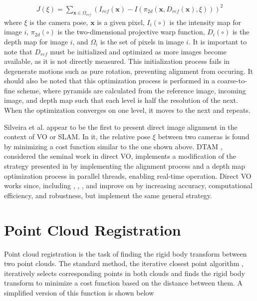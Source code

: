 \documentclass[conference]{IEEEtran}
\begin{document}
\begin{align}\label{cost_function}
    J(\xi) = \sum_{\textbf{x} \in \Omega_{ref}} (I_{ref}(\textbf{x}) - I(\pi_{2d}(\textbf{x}, D_{ref}(\textbf{x}), \xi)))^2
\end{align}
where $\xi$ is the camera pose, $\textbf{x}$ is a given pixel, $I_i(\circ)$ is the intensity map for image $i$, $\pi_{2d}(\circ)$ is the two-dimensional projective warp function, $D_i(\circ)$ is the depth map for image $i$, and $\Omega_i$ is the set of pixels in image $i$.
It is important to note that $D_{ref}$ must be initialized and optimized as more images become available, as it is not directly measured.
This initialization process fails in degenerate motions such as pure rotation, preventing alignment from occuring.
It should also be noted that this optimization process is performed in a coarse-to-fine scheme, where pyramids are calculated from the reference image, incoming image, and depth map such that each level is half the resolution of the next.
When the optimization converges on one level, it moves to the next and repeats.

Silveira et al. \cite{silveira_efficient_2008} appear to be the first to present direct image alignment in the context of VO or SLAM.
In it, the relative pose $\xi$ between two cameras is found by minimizing a cost function similar to the one shown above.
DTAM \cite{newcombe_dtam_2011}, considered the seminal work in direct VO, implements a modification of the strategy presented in \cite{silveira_efficient_2008} by implementing the alignment process and a depth map optimization process in parallel threads, enabling real-time operation.
Direct VO works since, including \cite{engel_semi-dense_2013}, \cite{forster_svo_2014}, \cite{fleet_lsd-slam_2014}, and \cite{engel_direct_2018} improve on \cite{newcombe_dtam_2011} by increasing accuracy, computational efficiency, and robustness, but implement the same general strategy.

\section{Point Cloud Registration}

Point cloud registration is the task of finding the rigid body transform between two point clouds.
The standard method, the iterative closest point algorithm \cite{besl_method_1992}, iteratively selects corresponding points in both clouds and finds the rigid body transform to minimize a cost function based on the distance between them.
A simplified version of this function is shown below
\end{document}

